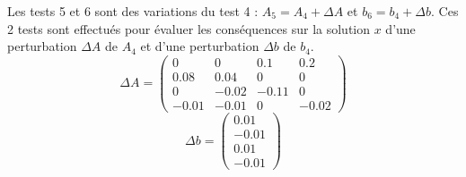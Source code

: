 Les tests 5 et 6 sont des variations du test 4 : $A_5 = A_4 + \Delta A$
et $b_6 = b_4 + \Delta b$. Ces 2 tests sont effectués pour évaluer 
les conséquences sur la solution $x$ d'une perturbation $\Delta A$ de $A_4$
et d'une perturbation $\Delta b$ de $b_4$.
$$\Delta A = \left(\begin{array}{rrrr}
0 & 0 & 0.1 & 0.2\\
0.08 & 0.04 & 0 & 0\\
0 & -0.02 & -0.11 & 0\\
-0.01 & -0.01 & 0 & -0.02
\end{array}
\right)$$
$$\Delta b = \left(\begin{array}{r}
0.01 \\ - 0.01 \\ 0.01 \\ -0.01
\end{array}\right)$$
